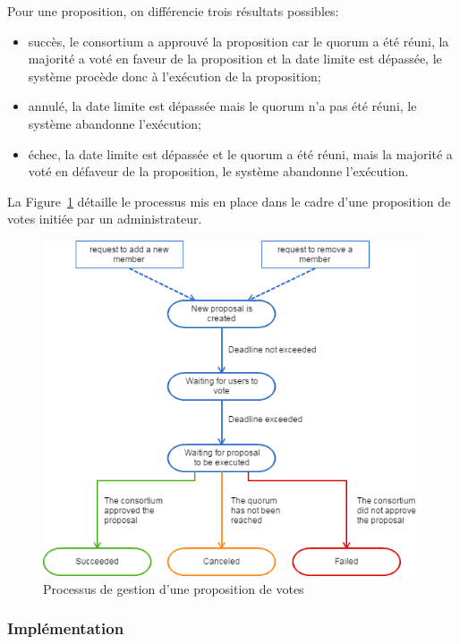 \documentclass{tnreport}
\begin{document}
Pour une proposition, on différencie trois résultats possibles:
\begin{itemize}
	\item succès, le consortium a approuvé la proposition car le quorum a été réuni, la majorité a voté en faveur de la proposition et la date limite est dépassée, le système procède donc à l'exécution de la proposition;
	\item annulé, la date limite est dépassée mais le quorum n'a pas été réuni, le système abandonne l'exécution;
	\item échec, la date limite est dépassée et le quorum a été réuni, mais la majorité a voté en défaveur de la proposition, le système abandonne l'exécution.
	\newline
\end{itemize}

La Figure~\ref{fig:user-flow} détaille le processus mis en place dans le cadre d'une proposition de votes initiée par un administrateur.

\begin{figure}[h]
	\centering
	\includegraphics[scale=0.7]{figures/user-management-flow}
	\caption{Processus de gestion d'une proposition de votes}
	\label{fig:user-flow}
\end{figure}

\subsubsection{Implémentation}
\end{document}
